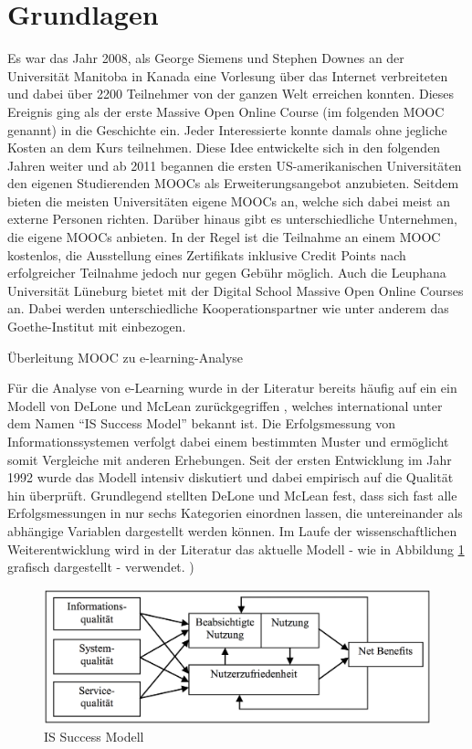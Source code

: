 \section{Grundlagen} %
\label{sec:grundlagen}
Es war das Jahr 2008, als George Siemens und Stephen Downes an der Universität Manitoba in Kanada eine Vorlesung über das Internet verbreiteten und dabei über 2200 Teilnehmer von der ganzen Welt erreichen konnten. Dieses Ereignis ging als der erste Massive Open Online Course (im folgenden MOOC genannt) in die Geschichte ein. Jeder Interessierte konnte damals ohne jegliche Kosten an dem Kurs teilnehmen. Diese Idee entwickelte sich in den folgenden Jahren weiter und ab 2011 begannen die ersten US-amerikanischen Universitäten den eigenen Studierenden MOOCs als Erweiterungsangebot anzubieten. Seitdem bieten die meisten Universitäten eigene MOOCs an, welche sich dabei meist an externe Personen richten. Darüber hinaus gibt es unterschiedliche Unternehmen, die eigene MOOCs anbieten. In der Regel ist die Teilnahme an einem MOOC kostenlos, die Ausstellung eines Zertifikats inklusive Credit Points nach erfolgreicher Teilnahme jedoch nur gegen Gebühr möglich.
\newline 
Auch die Leuphana Universität Lüneburg bietet mit der Digital School Massive Open Online Courses an. Dabei werden unterschiedliche Kooperationspartner wie unter anderem das Goethe-Institut mit einbezogen.

Überleitung MOOC zu e-learning-Analyse

Für die Analyse von e-Learning wurde in der Literatur bereits häufig auf ein ein Modell von DeLone und McLean zurückgegriffen \parencite[vgl.]{mohammadi2015factors}, welches international unter dem Namen "`IS Success Model"' bekannt ist. Die Erfolgsmessung von Informationssystemen verfolgt dabei einem bestimmten Muster und ermöglicht somit Vergleiche mit anderen Erhebungen. Seit der ersten Entwicklung im Jahr 1992 wurde das Modell intensiv diskutiert und dabei empirisch auf die Qualität hin überprüft. Grundlegend stellten DeLone und McLean fest, dass sich fast alle Erfolgsmessungen in nur sechs Kategorien einordnen lassen, die untereinander als abhängige Variablen dargestellt werden können. Im Laufe der wissenschaftlichen Weiterentwicklung wird in der Literatur das aktuelle Modell - wie in Abbildung \ref{IS Success Model} grafisch dargestellt - verwendet. \parencite[vgl.]{delone2002information})

\begin{figure}[h]
\centering
\includegraphics[width=1\textwidth]{Grafiken/issuccess.png}
\caption{IS Success Modell}
\label{IS Success Model}
\end{figure}


